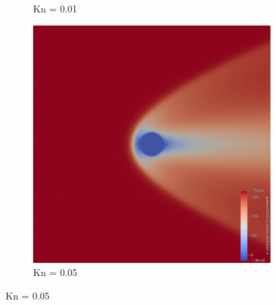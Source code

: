 \begin{figure}
\begin{subfigure}{0.32\textwidth}
        \caption{Kn = 0.01}
    \end{subfigure}
    \hfill
    \begin{subfigure}{0.32\textwidth}
        \centering
        \includegraphics[width=\textwidth]{Images/4. Results/Circle Kn/pv/Kn0.05.png}
        \caption{Kn = 0.05}
    \end{subfigure}
    
    \vspace{5pt}
    

\end{figure}
